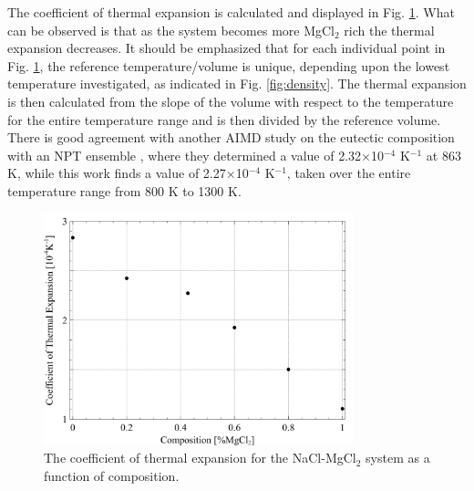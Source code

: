 \documentclass[review]{elsarticle}
\begin{document}
The coefficient of thermal expansion is calculated and displayed in Fig. \ref{fig:CTE}. What can be observed is that as the system becomes more MgCl$_2$ rich the thermal expansion decreases. It should be emphasized that for each individual point in Fig. \ref{fig:CTE}, the reference temperature/volume is unique, depending upon the lowest temperature investigated, as indicated in Fig. \ref{fig:density}. The thermal expansion is then calculated from the slope of the volume with respect to the temperature for the entire temperature range and is then divided by the reference volume.  There is good agreement with another AIMD study on the eutectic composition with an NPT ensemble \cite{XU2020568}, where they determined a value of 2.32$\times$10$^{-4}$ K$^{-1}$ at 863 K, while this work finds a value of 2.27$\times$10$^{-4}$ K$^{-1}$, taken over the entire temperature range from 800 K to 1300 K. 

\begin{figure}[h]
 \centering
 \includegraphics[width=0.8\textwidth]{images/CTE.jpg} 
 \caption{The coefficient of thermal expansion for the NaCl-MgCl$_{2}$ system as a function of composition.}
 \label{fig:CTE}
\end{figure} 
\FloatBarrier
\end{document}
